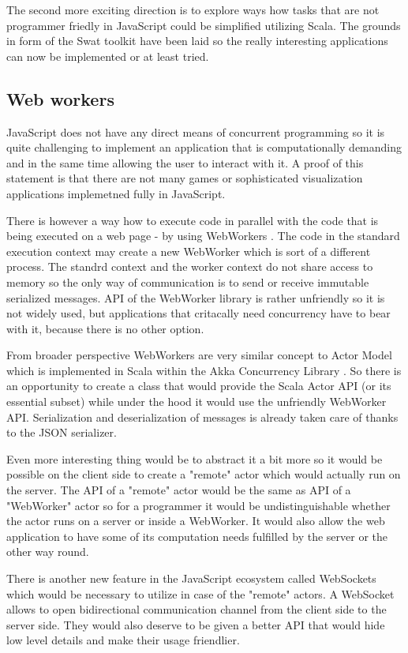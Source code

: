 \documentclass[12pt,a4paper]{report}
\begin{document}
The second more exciting direction is to explore ways how tasks that are not programmer friedly in JavaScript could be simplified utilizing Scala. The grounds in form of the Swat toolkit have been laid so the really interesting applications can now be implemented or at least tried.

\subsection{Web workers}

JavaScript does not have any direct means of concurrent programming so it is quite challenging to implement an application that is computationally demanding and in the same time allowing the user to interact with it. A proof of this statement is that there are not many games or sophisticated visualization applications implemetned fully in JavaScript.

There is however a way how to execute code in parallel with the code that is being executed on a web page - by using WebWorkers \cite{WebWorkers}. The code in the standard execution context may create a new WebWorker which is sort of a different process. The standrd context and the worker context do not share access to memory so the only way of communication is to send or receive immutable serialized messages. API of the WebWorker library is rather unfriendly so it is not widely used, but applications that critacally need concurrency have to bear with it, because there is no other option.

From broader perspective WebWorkers are very similar concept to Actor Model \cite{Actors} which is implemented in Scala within the Akka Concurrency Library \cite{Akka}. So there is an opportunity to create a class that would provide the Scala Actor API (or its essential subset) while under the hood it would use the unfriendly WebWorker API. Serialization and deserialization of messages is already taken care of thanks to the JSON serializer. 

Even more interesting thing would be to abstract it a bit more so it would be possible on the client side to create a "remote" actor which would actually run on the server. The API of a "remote" actor would be the same as API of a "WebWorker" actor so for a programmer it would be undistinguishable whether the actor runs on a server or inside a WebWorker. It would also allow the web application to have some of its computation needs fulfilled by the server or the other way round.

There is another new feature in the JavaScript ecosystem called WebSockets \cite{WebSockets} which would be necessary to utilize in case of the "remote" actors. A WebSocket allows to open bidirectional communication channel from the client side to the server side. They would also deserve to be given a better API that would hide low level details and make their usage friendlier.
\end{document}
